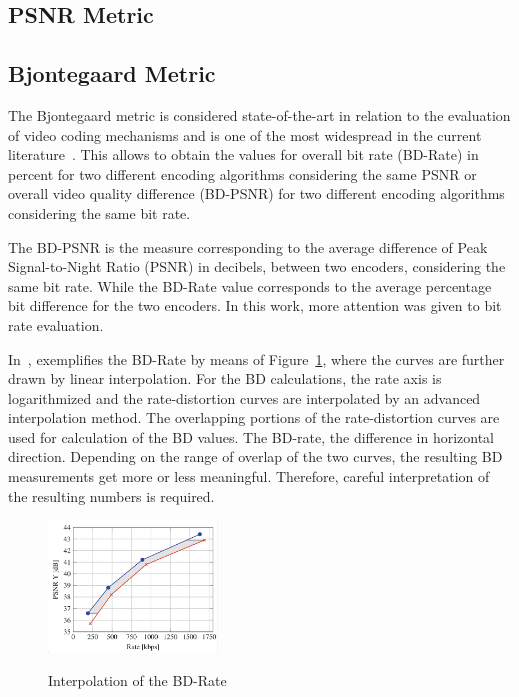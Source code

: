 \documentclass{acm_proc_article-sp}
\begin{document}
\subsection{PSNR Metric}

\subsection{Bjontegaard Metric}

The Bjontegaard metric is considered state-of-the-art in relation to the evaluation of video coding mechanisms and is one of the most widespread in the current literature~\cite{Bjontegaard:01}\cite{Mathias}. This allows to obtain the values for overall bit rate (BD-Rate) in percent for two different encoding algorithms
considering the same PSNR or overall video quality difference (BD-PSNR) for two different encoding algorithms considering the same bit rate. %
	
The BD-PSNR is the measure corresponding to the average difference of Peak Signal-to-Night Ratio (PSNR) in decibels, between two encoders, considering the same bit rate. While the BD-Rate value corresponds to the average percentage bit difference for the two encoders. In this work, more attention was given to bit rate evaluation.	


In~\cite{Mathias}, exemplifies the BD-Rate by means of Figure~\ref{fig:chart_barate}, where the curves are further drawn by linear interpolation. For the BD calculations, the rate axis is logarithmized and the rate-distortion curves are interpolated by an advanced interpolation method. The overlapping portions of the rate-distortion curves are used for calculation of the BD values. The BD-rate, the difference in horizontal direction. Depending on the range of overlap of the two curves, the resulting BD measurements get more or less meaningful. Therefore, careful interpretation of the resulting numbers is required.


\FloatBarrier
\begin{figure}[!ht]
	\centering
	\caption{Interpolation of the BD-Rate \cite{Mathias}}
	\includegraphics[width=0.4\textwidth]{figures/chartbdrate.png}
	\label{fig:chart_barate}
\end{figure}
\FloatBarrier
	
\end{document}
